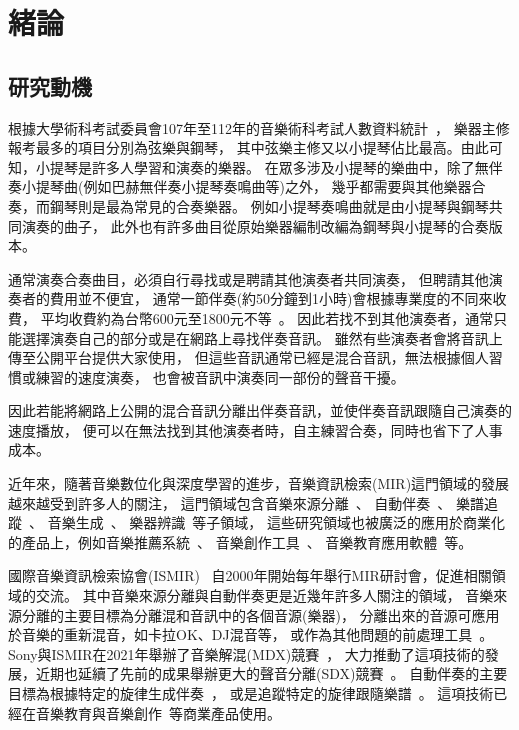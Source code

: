 \documentclass[class=NCU_thesis, crop=false]{standalone}
\begin{document}
\chapter{緒論}
\section{研究動機}

根據大學術科考試委員會107年至112年的音樂術科考試人數資料統計~\cite{CAPE2024Statistics}，
樂器主修報考最多的項目分別為弦樂與鋼琴，
其中弦樂主修又以小提琴佔比最高。由此可知，小提琴是許多人學習和演奏的樂器。
在眾多涉及小提琴的樂曲中，除了無伴奏小提琴曲(例如巴赫無伴奏小提琴奏鳴曲等)之外，
幾乎都需要與其他樂器合奏，而鋼琴則是最為常見的合奏樂器。
例如小提琴奏鳴曲就是由小提琴與鋼琴共同演奏的曲子，
此外也有許多曲目從原始樂器編制改編為鋼琴與小提琴的合奏版本。

通常演奏合奏曲目，必須自行尋找或是聘請其他演奏者共同演奏，
但聘請其他演奏者的費用並不便宜，
通常一節伴奏(約50分鐘到1小時)會根據專業度的不同來收費，
平均收費約為台幣600元至1800元不等~\cite{2020PianoAccompanistHourlySalary}。
因此若找不到其他演奏者，通常只能選擇演奏自己的部分或是在網路上尋找伴奏音訊。
雖然有些演奏者會將音訊上傳至公開平台提供大家使用，
但這些音訊通常已經是混合音訊，無法根據個人習慣或練習的速度演奏，
也會被音訊中演奏同一部份的聲音干擾。

因此若能將網路上公開的混合音訊分離出伴奏音訊，並使伴奏音訊跟隨自己演奏的速度播放，
便可以在無法找到其他演奏者時，自主練習合奏，同時也省下了人事成本。

近年來，隨著音樂數位化與深度學習的進步，音樂資訊檢索(MIR)這門領域的發展越來越受到許多人的關注，
這門領域包含音樂來源分離~\cite{défossez2021music, Cano2019Musical, Rafii2018Overview}、
自動伴奏~\cite{davies2007towards, li2020application, zhang2023design}、
樂譜追蹤~\cite{orio2003score, dorfer2016towards}、
音樂生成~\cite{ji2020comprehensive, hernandez2022music}、
樂器辨識~\cite{solanki2022music, racharla2020predominant, manilow2020hierarchical}等子領域，
這些研究領域也被廣泛的應用於商業化的產品上，例如音樂推薦系統~\cite{Mangla2023Spotify}、
音樂創作工具~\cite{Ableton2024Ableton11, Apple2024LogicPro, PreSonus2024StudioOne}、
音樂教育應用軟體~\cite{Ronimusic2024Amazing, FORSCORE2024forScore}等。

國際音樂資訊檢索協會(ISMIR)~\cite{ISMIR2024InternationalSociety}
自2000年開始每年舉行MIR研討會，促進相關領域的交流。
其中音樂來源分離與自動伴奏更是近幾年許多人關注的領域，
音樂來源分離的主要目標為分離混和音訊中的各個音源(樂器)，
分離出來的音源可應用於音樂的重新混音，如卡拉OK、DJ混音等，
或作為其他問題的前處理工具~\cite{zhao2022research}。
Sony與ISMIR在2021年舉辦了音樂解混(MDX)競賽~\cite{Yuki_Mitsufuji2021MusicDemixing}，
大力推動了這項技術的發展，近期也延續了先前的成果舉辦更大的聲音分離(SDX)競賽~\cite{Fabbro_Giorgio2023TheSoundDemixing}。
自動伴奏的主要目標為根據特定的旋律生成伴奏~\cite{wang2022songdriver, ding2023museflow}，
或是追蹤特定的旋律跟隨樂譜~\cite{brazier2021improving}。
這項技術已經在音樂教育與音樂創作~\cite{Antescofo2024metronautapp}等商業產品使用。
\end{document}

